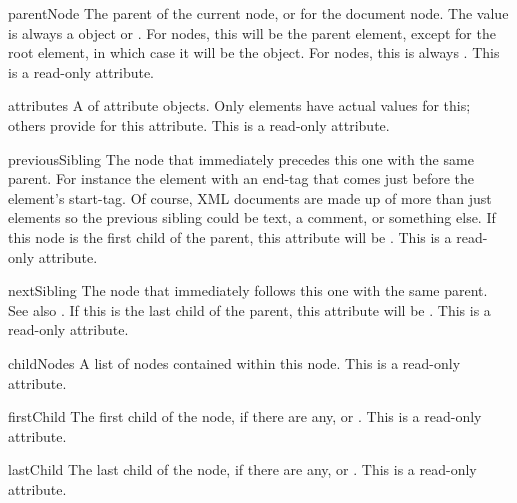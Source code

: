 \begin{memberdesc}[Node]{parentNode}
The parent of the current node, or  for the document node.
The value is always a  object or .  For
 nodes, this will be the parent element, except for the
root element, in which case it will be the  object.
For  nodes, this is always .
This is a read-only attribute.
\end{memberdesc}

\begin{memberdesc}[Node]{attributes}
A  of attribute objects.  Only elements have
actual values for this; others provide  for this attribute.
This is a read-only attribute.
\end{memberdesc}

\begin{memberdesc}[Node]{previousSibling}
The node that immediately precedes this one with the same parent.  For
instance the element with an end-tag that comes just before the
 element's start-tag.  Of course, XML documents are made
up of more than just elements so the previous sibling could be text, a
comment, or something else.  If this node is the first child of the
parent, this attribute will be .
This is a read-only attribute.
\end{memberdesc}

\begin{memberdesc}[Node]{nextSibling}
The node that immediately follows this one with the same parent.  See
also .  If this is the last child of the
parent, this attribute will be .
This is a read-only attribute.
\end{memberdesc}

\begin{memberdesc}[Node]{childNodes}
A list of nodes contained within this node.
This is a read-only attribute.
\end{memberdesc}

\begin{memberdesc}[Node]{firstChild}
The first child of the node, if there are any, or .
This is a read-only attribute.
\end{memberdesc}

\begin{memberdesc}[Node]{lastChild}
The last child of the node, if there are any, or .
This is a read-only attribute.
\end{memberdesc}


